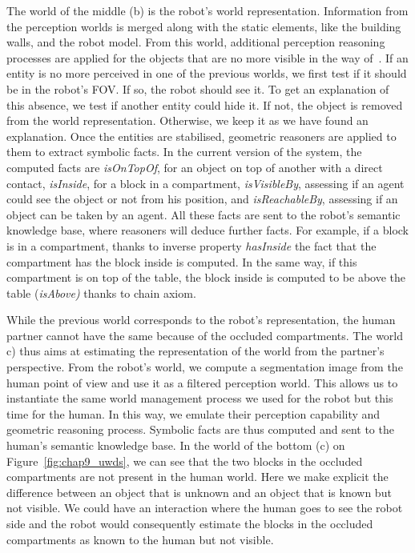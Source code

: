 The world of the middle (b) is the robot's world representation. Information from the perception worlds is merged along with the static elements, like the building walls, and the robot model. From this world, additional perception reasoning processes are applied for the objects that are no more visible in the way of~\cite{milliez_2014_framework}. If an entity is no more perceived in one of the previous worlds, we first test if it should be in the robot's FOV. If so, the robot should see it. To get an explanation of this absence, we test if another entity could hide it. If not, the object is removed from the world representation. Otherwise, we keep it as we have found an explanation.
Once the entities are stabilised, geometric reasoners are applied to them to extract symbolic facts. In the current version of the system, the computed facts are \textit{isOnTopOf}, for an object on top of another with a direct contact, \textit{isInside}, for a block in a compartment, \textit{isVisibleBy}, assessing if an agent could see the object or not from his position, and \textit{isReachableBy}, assessing if an object can be taken by an agent. All these facts are sent to the robot's semantic knowledge base, where reasoners will deduce further facts. For example, if a block is in a compartment, thanks to inverse property \textit{hasInside} the fact that the compartment has the block inside is computed. In the same way, if this compartment is on top of the table, the block inside is computed to be above the table (\textit{isAbove)} thanks to chain axiom.

While the previous world corresponds to the robot's representation, the human partner cannot have the same because of the occluded compartments. The world c) thus aims at estimating the representation of the world from the partner's perspective. From the robot's world, we compute a segmentation image from the human point of view and use it as a filtered perception world. This allows us to instantiate the same world management process we used for the robot but this time for the human. In this way, we emulate their perception capability and geometric reasoning process. Symbolic facts are thus computed and sent to the human's semantic knowledge base. In the world of the bottom (c) on Figure~\ref{fig:chap9_uwds}, we can see that the two blocks in the occluded compartments are not present in the human world. Here we make explicit the difference between an object that is unknown and an object that is known but not visible. We could have an interaction where the human goes to see the robot side and the robot would consequently estimate the blocks in the occluded compartments as known to the human but not visible.

